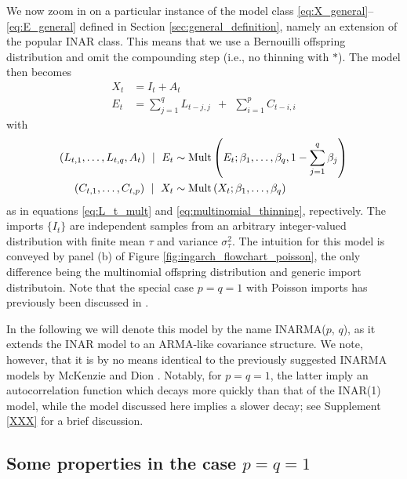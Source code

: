 \documentclass{article}
\begin{document}
We now zoom in on a particular instance of the model class \eqref{eq:X_general}--\eqref{eq:E_general} defined in Section \ref{sec:general_definition}, namely an extension of the popular INAR class. This means that we use a Bernouilli offspring distribution and omit the compounding step (i.e., no thinning with $*$). The model then becomes
\begin{align}
X_t & = I_t + A_t\label{eq:X_inarma}\\
E_t & = \sum_{j = 1}^q L_{t - j, j} \ \ + \ \ \sum_{i = 1}^p C_{t - i, i}\label{eq:E_inarma}
\end{align}
with
\begin{align}
(L_{t, 1}, \dots, L_{t, q}, A_t) \ \mid \ E_t & \sim \textnormal{Mult}\left(E_t; \beta_1, \dots, \beta_q, 1 - \sum_{j = 1}^q \beta_j\right)\\
(C_{t, 1}, \dots, C_{t, p}) \ \mid \ X_t & \sim \text{Mult}\left(X_t; \beta_1, \dots, \beta_q\right)\label{eq:C_t_inarma}
\end{align}
as in equations \eqref{eq:L_t_mult} and \eqref{eq:multinomial_thinning}, repectively. The imports $\{I_t\}$ are independent samples from an arbitrary integer-valued distribution with finite mean $\tau$ and variance $\sigma^2_\tau$. The intuition for this model is conveyed by panel (b) of Figure \ref{fig:ingarch_flowchart_poisson}, the only difference being the multinomial offspring distribution and generic import distributoin. Note that the special case $p = q = 1$ with Poisson imports has previously been discussed in \cite{Bracher2019}.

In the following we will denote this model by the name INARMA($p$, $q$), as it extends the INAR model to an ARMA-like covariance structure. We note, however, that it is by no means identical to the previously suggested INARMA models by McKenzie \cite{McKenzie1988} and Dion \cite{Dion1995}. Notably, for $p = q = 1$, the latter imply an autocorrelation function which decays more quickly than that of the INAR(1) model, while the model discussed here implies a slower decay; see Supplement \ref{XXX} for a brief discussion.

\subsection{Some properties in the case $p = q = 1$}
\end{document}
